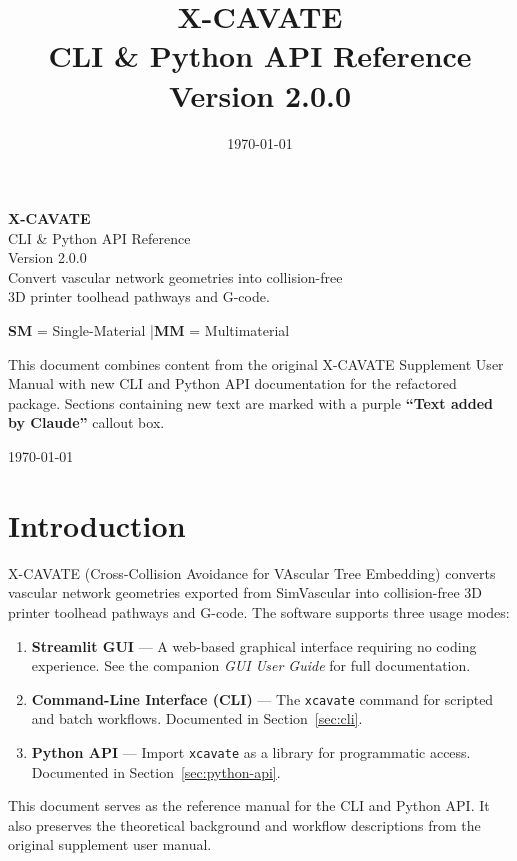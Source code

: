 \documentclass[11pt,letterpaper]{article}
\title{
    \vspace{-1cm}
    \textbf{\Huge X-CAVATE}\\[8pt]
    \LARGE CLI \& Python API Reference\\[6pt]
    \large Version 2.0.0
}
\author{}
\date{\today}
\newcommand{\code}[1]{\texttt{#1}}
\begin{document}
\begin{titlepage}
\centering
\vspace*{3cm}

{\Huge \textbf{X-CAVATE}}\\[12pt]
{\LARGE CLI \& Python API Reference}\\[20pt]
{\large Version 2.0.0}\\[40pt]

{\large Convert vascular network geometries into collision-free\\[4pt]
3D printer toolhead pathways and G-code.}

\vspace{2cm}

{\normalsize
\textbf{SM} = Single-Material \quad|\quad \textbf{MM} = Multimaterial
}

\vspace{1cm}

{\small This document combines content from the original X-CAVATE Supplement
User Manual with new CLI and Python API documentation for the refactored
package. Sections containing new text are marked with a purple
\textcolor{claudepurple}{\textbf{``Text added by Claude''}} callout box.}

\vfill

{\normalsize \today}

\end{titlepage}

\tableofcontents
\newpage

\section{Introduction}
\label{sec:intro}

\begin{claudebox}
X-CAVATE (Cross-Collision Avoidance for VAscular Tree Embedding) converts
vascular network geometries exported from SimVascular into collision-free 3D
printer toolhead pathways and G-code. The software supports three usage modes:

\begin{enumerate}[leftmargin=*]
    \item \textbf{Streamlit GUI} --- A web-based graphical interface requiring
    no coding experience. See the companion \textit{GUI User Guide} for full
    documentation.
    \item \textbf{Command-Line Interface (CLI)} --- The \code{xcavate} command
    for scripted and batch workflows. Documented in
    Section~\ref{sec:cli}.
    \item \textbf{Python API} --- Import \code{xcavate} as a library for
    programmatic access. Documented in Section~\ref{sec:python-api}.
\end{enumerate}

This document serves as the reference manual for the CLI and Python API. It
also preserves the theoretical background and workflow descriptions from the
original supplement user manual.
\end{claudebox}
\end{document}

